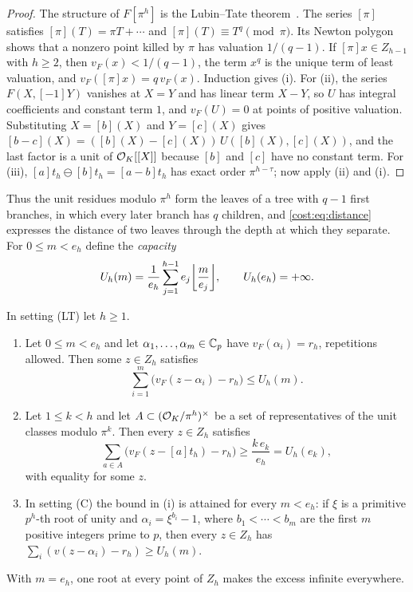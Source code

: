 \begin{proof}
The structure of $F[\pi^h]$ is the Lubin--Tate theorem~\cite{LubinTate1965Formal}. The series
$[\pi]$ satisfies $[\pi](T)=\pi T+\cdots$ and $[\pi](T)\equiv T^q\pmod\pi$. Its Newton polygon
shows that a nonzero point killed by $\pi$ has valuation $1/(q-1)$. If $[\pi]x\in Z_{h-1}$
with $h\ge2$, then $v_F(x)<1/(q-1)$, the term $x^q$ is the unique term of least valuation,
and $v_F([\pi]x)=q\,v_F(x)$. Induction gives (i). For (ii), the series $F(X,[-1]Y)$
vanishes at $X=Y$ and has linear term $X-Y$, so $U$ has integral coefficients and constant
term $1$, and $v_F(U)=0$ at points of positive valuation. Substituting $X=[b](X)$ and
$Y=[c](X)$ gives $[b-c](X)=([b](X)-[c](X))\,U([b](X),[c](X))$, and the last factor is a
unit of $\mathcal{O}_K[[X]]$ because $[b]$ and $[c]$ have no constant term. For (iii), $[a]t_h\ominus[b]t_h=[a-b]t_h$ has exact order
$\pi^{h-\tau}$; now apply (ii) and (i).
\end{proof}

Thus the unit residues modulo $\pi^h$ form the leaves of a tree with $q-1$ first branches,
in which every later branch has $q$ children, and \eqref{cost:eq:distance} expresses the
distance of two leaves through the depth at which they separate. For $0\le m<e_h$ define the
\emph{capacity}
\begin{equation}\label{cost:eq:capacity}
 U_h(m)=\frac1{e_h}\sum_{j=1}^{h-1}e_j\floor*{\frac m{e_j}},\qquad U_h(e_h)=+\infty.
\end{equation}

\begin{lemma}\label{cost:lem:shell}
In setting \textup{(LT)} let $h\ge1$.
\begin{enumerate}[label=\textup{(\roman*)}]
\item Let $0\le m<e_h$ and let $\alpha_1,\ldots,\alpha_m\in\mathbb{C}_p$ have $v_F(\alpha_i)=r_h$,
repetitions allowed. Then some $z\in Z_h$ satisfies
\[
 \sum_{i=1}^m\bigl(v_F(z-\alpha_i)-r_h\bigr)\le U_h(m).
\]
\item Let $1\le k<h$ and let $A\subset(\mathcal{O}_K/\pi^h)^\times$ be a set of representatives of the
unit classes modulo $\pi^k$. Then every $z\in Z_h$ satisfies
\[
 \sum_{a\in A}\bigl(v_F(z-[a]t_h)-r_h\bigr)\ge\frac{k\,e_k}{e_h}=U_h(e_k),
\]
with equality for some $z$.
\item In setting \textup{(C)} the bound in \textup{(i)} is attained for every $m<e_h$:
if $\xi$ is a primitive $p^h$-th root of unity and $\alpha_i=\xi^{b_i}-1$, where
$b_1<\cdots<b_m$ are the first $m$ positive integers prime to $p$, then every $z\in Z_h$ has
$\sum_i(v(z-\alpha_i)-r_h)\ge U_h(m)$.
\end{enumerate}
With $m=e_h$, one root at every point of $Z_h$ makes the excess infinite everywhere.
\end{lemma}

